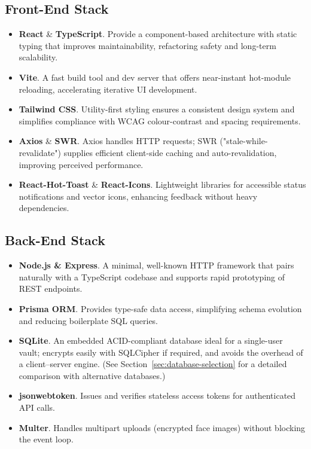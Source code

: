 \subsection*{Front-End Stack}
\begin{itemize}
  \item \textbf{React} \& \textbf{TypeScript}. Provide a component-based architecture with static typing that improves maintainability, refactoring safety and long-term scalability.
  \item \textbf{Vite}. A fast build tool and dev server that offers near-instant hot-module reloading, accelerating iterative UI development.
  \item \textbf{Tailwind CSS}. Utility-first styling ensures a consistent design system and simplifies compliance with WCAG colour-contrast and spacing requirements.
  \item \textbf{Axios} \& \textbf{SWR}. Axios handles HTTP requests; SWR ("stale-while-revalidate") supplies efficient client-side caching and auto-revalidation, improving perceived performance.
  \item \textbf{React-Hot-Toast} \& \textbf{React-Icons}. Lightweight libraries for accessible status notifications and vector icons, enhancing feedback without heavy dependencies.
\end{itemize}

\subsection*{Back-End Stack}
\begin{itemize}
  \item \textbf{Node.js \& Express}. A minimal, well-known HTTP framework that pairs naturally with a TypeScript codebase and supports rapid prototyping of REST endpoints.
  \item \textbf{Prisma ORM}. Provides type-safe data access, simplifying schema evolution and reducing boilerplate SQL queries.
  \item \textbf{SQLite}. An embedded ACID-compliant database ideal for a single-user vault; encrypts easily with SQLCipher if required, and avoids the overhead of a client–server engine. (See Section~\ref{sec:database-selection} for a detailed comparison with alternative databases.)
  \item \textbf{jsonwebtoken}. Issues and verifies stateless access tokens for authenticated API calls.
  \item \textbf{Multer}. Handles multipart uploads (encrypted face images) without blocking the event loop.
\end{itemize}

